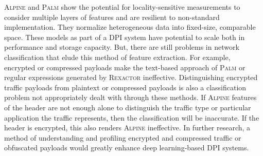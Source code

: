 \textsc{Alpine} and \textsc{Palm} show the potential for locality-sensitive measurements to consider multiple layers of features and are resilient to non-standard implementation. They normalize heterogeneous data into fixed-size, comparable space. These models as part of a DPI system have potential to scale both in performance and storage capacity. But, there are still problems in network classification that elude this method of feature extraction. For example, encrypted or compressed payloads make the text-based approach of \textsc{Palm} or regular expressions generated by \textsc{Rexactor} ineffective. Distinguishing encrypted traffic payloads from plaintext or compressed payloads is also a classification problem not appropriately dealt with through these methods. If \textsc{Alpine} features of the header are not enough alone to distinguish the traffic type or particular application the traffic represents, then the classification will be inaccurate. If the header is encrypted, this also renders \textsc{Alpine} ineffective. In further research, a method of understanding and profiling encrypted and compressed traffic or obfuscated payloads would greatly enhance deep learning-based DPI systems.
